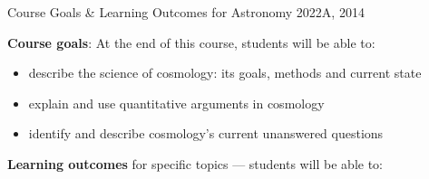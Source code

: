 \documentclass[11pt]{article}
\begin{document}
\begin{center}
{\Large Course Goals \& Learning Outcomes for Astronomy 2022A, 2014}
\end{center}

\vspace{0.5cm}

{\bf Course goals}: At the end of this course, students will be able to:
\begin{itemize}
\item describe the science of cosmology: its goals, methods and current state
\item explain and use quantitative arguments in cosmology 
\item identify and describe cosmology's current unanswered questions 
\end{itemize}

\vspace{0.5cm}
{\bf Learning outcomes} for specific topics --- students will be able to:
\end{document}
